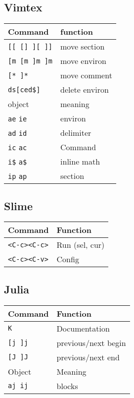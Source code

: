 \documentclass[a4paper]{article}
\newcommand{\kc}[1]{\texttt{\textless #1\textgreater}}
\begin{document}
\begin{minipage}[t]{0.33\textwidth}
  \subsection*{Vimtex}
  \begin{tabular}{l l}
    \toprule
    Command                   & function       \\
    \midrule
    \texttt{[[ [] ][ ]]}      & move section   \\
    \texttt{[m [m ]m ]m}      & move environ   \\
    \texttt{[* ]*}            & move comment   \\
    \texttt{ds[ced\$]}        & delete environ \\
    \midrule
    \midrule
    object                    & meaning        \\
    \midrule
    \texttt{ae} \texttt{ie}   & environ        \\
    \texttt{ad} \texttt{id}   & delimiter      \\
    \texttt{ic} \texttt{ac}   & Command        \\
    \texttt{i\$} \texttt{a\$} & inline math    \\
    \texttt{ip} \texttt{ap}   & section        \\
    \bottomrule
  \end{tabular}
  \subsection*{Slime}
  \begin{tabular}{l l}
    \toprule
    Command & Function \\
    \midrule
    \kc{C-c}\kc{C-c} & Run (sel, cur)\\
    \kc{C-c}\kc{C-v} & Config\\
    \bottomrule
  \end{tabular}
  \subsection*{Julia}
  \begin{tabular}{l l}
    \toprule
    Command        & Function            \\
    \midrule
    \texttt{K}     & Documentation       \\
    \texttt{[j ]j} & previous/next begin \\
    \texttt{[J ]J} & previous/next end   \\
    \midrule
    \midrule
    Object         & Meaning             \\
    \midrule
    \texttt{aj ij} & blocks              \\
    \bottomrule
  \end{tabular}
\end{minipage}
\end{document}
